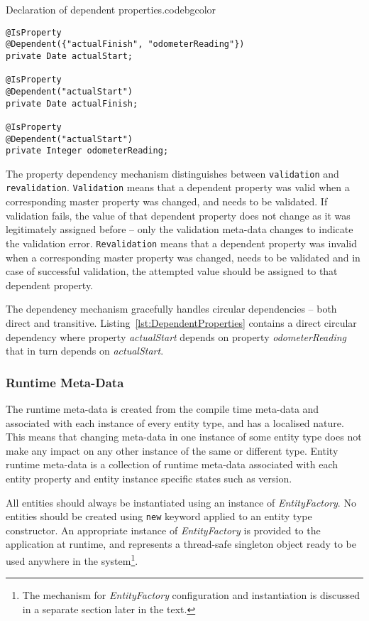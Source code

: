   \begin{code}{Declaration of dependent properties.}{\label{lst:DependentProperties}}{codebgcolor}
    \begin{lstlisting}
@IsProperty
@Dependent({"actualFinish", "odometerReading"})
private Date actualStart;

@IsProperty
@Dependent("actualStart")
private Date actualFinish;

@IsProperty
@Dependent("actualStart")
private Integer odometerReading;
    \end{lstlisting}
  \end{code}

  The property dependency mechanism distinguishes between \texttt{validation} and \texttt{revalidation}.
  \texttt{Validation} means that a dependent property was valid when a corresponding master property was changed, and needs to be validated.
  If validation fails, the value of that dependent property does not change as it was legitimately assigned before -- only the validation meta-data changes to indicate the validation error.
  \texttt{Revalidation} means that a dependent property was invalid when a corresponding master property was changed, needs to be validated and in case of successful validation, the attempted value should be assigned to that dependent property.
  
  The dependency mechanism gracefully handles circular dependencies -- both direct and transitive.
  Listing~\ref{lst:DependentProperties} contains a direct circular dependency where property \emph{actualStart} depends on property \emph{odometerReading} that in turn depends on \emph{actualStart}.
  

\subsubsection{Runtime Meta-Data}

  The runtime meta-data is created from the compile time meta-data and associated with each instance of every entity type, and has a localised nature.
  This means that changing meta-data in one instance of some entity type does not make any impact on any other instance of the same or different type.
  Entity runtime meta-data is a collection of runtime meta-data associated with each entity property and entity instance specific states such as version.
  
  All entities should always be instantiated using an instance of \emph{EntityFactory}.  
  No entities should be created using \texttt{new} keyword applied to an entity type constructor.
  An appropriate instance of \emph{EntityFactory} is provided to the application at runtime, and represents a thread-safe singleton object ready to be used anywhere in the system\footnote{The mechanism for \emph{EntityFactory} configuration and instantiation is discussed in a separate section later in the text.}.
  
